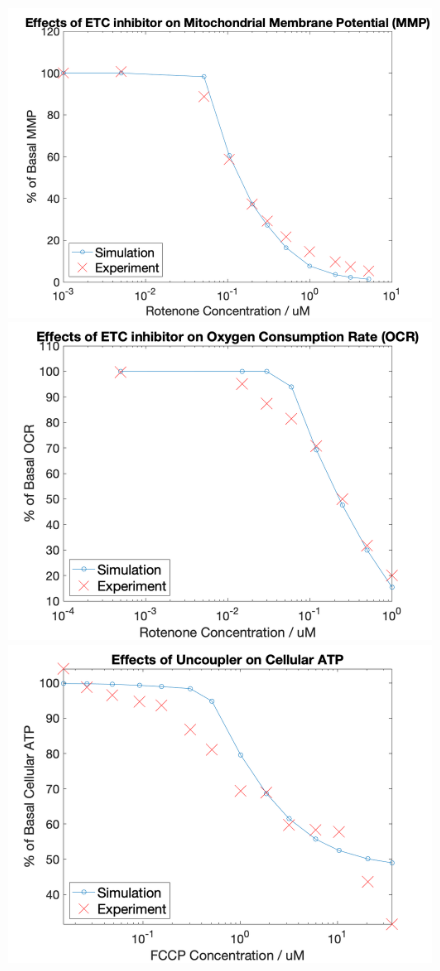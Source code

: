 \documentclass[12pt]{article}
\begin{document}
\begin{figure}[ht]
  \begin{minipage}[b]{0.5\linewidth}
    \centering
    \includegraphics[width=\linewidth]{etc_mmp.png} 
  \end{minipage}%
  \begin{minipage}[b]{0.5\linewidth}
    \centering
    \includegraphics[width=\linewidth]{etc_ocr.png} 
  \end{minipage} 
  \begin{minipage}[b]{0.5\linewidth}
    \centering
    \includegraphics[width=\linewidth]{uncp_atp.png} 

\end{minipage}
\end{figure}
\end{document}

